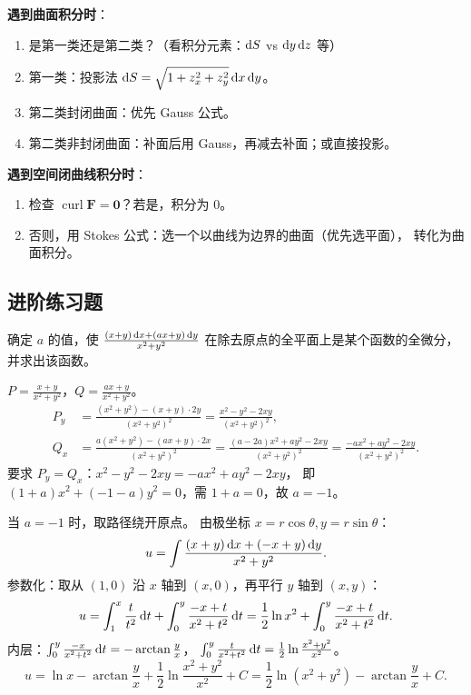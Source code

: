 \documentclass{article}
\DeclareMathOperator{\curl}{curl}
\begin{document}
\textbf{遇到曲面积分时}：
\begin{enumerate}
  \item 是第一类还是第二类？（看积分元素：$\mathrm{d} S$ vs $\mathrm{d} y\,\mathrm{d} z$ 等）
  \item 第一类：投影法 $\mathrm{d} S = \sqrt{1+z_x^2+z_y^2}\,\mathrm{d} x\,\mathrm{d} y$。
  \item 第二类封闭曲面：优先 Gauss 公式。
  \item 第二类非封闭曲面：补面后用 Gauss，再减去补面；或直接投影。
\end{enumerate}

\textbf{遇到空间闭曲线积分时}：
\begin{enumerate}
  \item 检查 $\curl\mathbf{F} = \mathbf{0}$？若是，积分为 $0$。
  \item 否则，用 Stokes 公式：选一个以曲线为边界的曲面（优先选平面），
    转化为曲面积分。
\end{enumerate}

\subsection{进阶练习题}

\begin{exercise}
  确定 $a$ 的值，使 $\frac{(x+y)\,\mathrm{d} x + (ax+y)\,\mathrm{d} y}{x^2+y^2}$
  在除去原点的全平面上是某个函数的全微分，并求出该函数。
\end{exercise}

\begin{solution}
  $P = \frac{x+y}{x^2+y^2}$，$Q = \frac{ax+y}{x^2+y^2}$。
  \begin{align*}
    P_y &= \frac{(x^2+y^2) - (x+y)\cdot 2y}{(x^2+y^2)^2}
    = \frac{x^2-y^2-2xy}{(x^2+y^2)^2}, \\
    Q_x &= \frac{a(x^2+y^2) - (ax+y)\cdot 2x}{(x^2+y^2)^2}
    = \frac{(a-2a)x^2 + ay^2 - 2xy}{(x^2+y^2)^2}
    = \frac{-ax^2 + ay^2 - 2xy}{(x^2+y^2)^2}.
  \end{align*}
  要求 $P_y = Q_x$：$x^2-y^2-2xy = -ax^2+ay^2-2xy$，
  即 $(1+a)x^2 + (-1-a)y^2 = 0$，需 $1+a=0$，故 $a = -1$。

  当 $a=-1$ 时，取路径绕开原点。
  由极坐标 $x=r\cos\theta, y=r\sin\theta$：
  \[
    u = \int \frac{(x+y)\,\mathrm{d} x + (-x+y)\,\mathrm{d} y}{x^2+y^2}.
  \]
  参数化：取从 $(1,0)$ 沿 $x$ 轴到 $(x,0)$，再平行 $y$ 轴到 $(x,y)$：
  \[
    u = \int_1^x \frac{t}{t^2}\,\mathrm{d} t + \int_0^y \frac{-x+t}{x^2+t^2}\,\mathrm{d} t
    = \frac{1}{2}\ln x^2 + \int_0^y \frac{-x+t}{x^2+t^2}\,\mathrm{d} t.
  \]
  内层：$\int_0^y \frac{-x}{x^2+t^2}\,\mathrm{d} t = -\arctan\frac{y}{x}$，
  $\int_0^y \frac{t}{x^2+t^2}\,\mathrm{d} t = \frac{1}{2}\ln\frac{x^2+y^2}{x^2}$。
  \[
    u = \ln x - \arctan\frac{y}{x} + \frac{1}{2}\ln\frac{x^2+y^2}{x^2} + C
    = \frac{1}{2}\ln(x^2+y^2) - \arctan\frac{y}{x} + C.
  \]
\end{solution}
\end{document}
